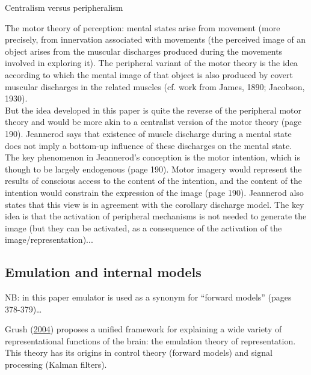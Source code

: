 \documentclass[a4paper,12pt,twoside,openright,oldfontcommands]{memoir}
\begin{document}
\vspace{2mm}

\begin{mybox}[label = centralism]{Centralism versus peripheralism}

The motor theory of perception: mental states arise from movement (more precisely, from innervation associated with movements (the perceived image of an object arises from the muscular discharges produced during the movements involved in exploring it). The peripheral variant of the motor theory is the idea according to which the mental image of that object is also produced by covert muscular discharges in the related muscles (cf. work from James, 1890; Jacobson, 1930).\\

But the idea developed in this paper is quite the reverse of the peripheral motor theory and would be more akin to a centralist version of the motor theory (page 190). Jeannerod says that existence of muscle discharge during a mental state does not imply a bottom-up influence of these discharges on the mental state. The key phenomenon in Jeannerod’s conception is the motor intention, which is though to be largely endogenous (page 190). Motor imagery would represent the results of conscious access to the content of the intention, and the content of the intention would constrain the expression of the image (page 190). Jeannerod also states that this view is in agreement with the corollary discharge model. The key idea is that the activation of peripheral mechanisms is not needed to generate the image (but they can be activated, as a consequence of the activation of the image/representation)...

\end{mybox}

\hypertarget{emulation-and-internal-models}{%
\subsection{Emulation and internal models}\label{emulation-and-internal-models}}

NB: in this paper emulator is used as a synonym for \enquote{forward models} (pages 378-379)\ldots{}

Grush (\protect\hyperlink{ref-grush_emulation_2004}{2004}) proposes a unified framework for explaining a wide variety of representational functions of the brain: the emulation theory of representation. This theory has its origins in control theory (forward models) and signal processing (Kalman filters).
\end{document}
